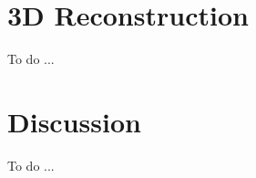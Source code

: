 
\section{3D Reconstruction}\label{sec:exp_3d_reconstruction}
To do ...

\section{Discussion}\label{sec:exp_discussion}
To do ...